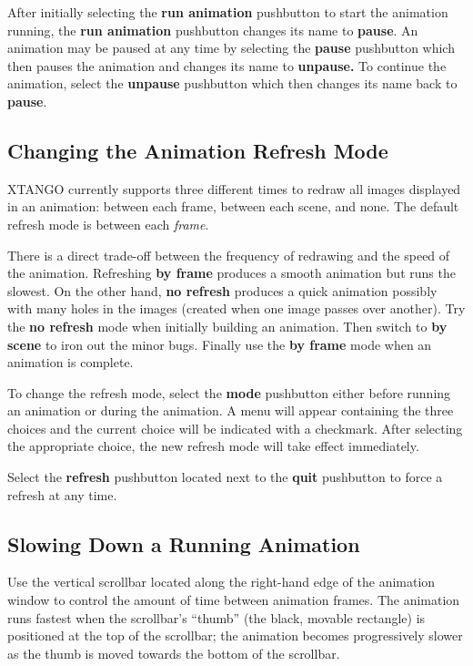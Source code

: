 After initially selecting the {\bf run animation} pushbutton to start the
animation running, the {\bf run animation} pushbutton changes its name to
{\bf pause}.  An animation may be paused at any time by selecting the
{\bf pause} pushbutton which then pauses the animation and changes its name
to {\bf unpause.} To continue the animation, select the {\bf unpause}
pushbutton which then changes its name back to {\bf pause}.

\subsection{Changing the Animation Refresh Mode}

XTANGO currently supports three different times to redraw all images
displayed in an animation: between each frame, between each scene, and
none.  The default refresh mode is between each {\em frame}.

There is a direct trade-off between the frequency of redrawing and the
speed of the animation.  Refreshing {\bf by frame} produces a smooth
animation but runs the slowest.  On the other hand, {\bf no refresh}
produces a quick animation possibly with many holes in the images
(created when one image passes over another).  Try the {\bf no refresh}
mode when initially building an animation.  Then switch to {\bf by scene}
to iron out the minor bugs.  Finally use the {\bf by frame} mode when an
animation is complete.

To change the refresh mode, select the {\bf mode} pushbutton either
before running an animation or during the animation.  A menu will
appear containing the three choices and the current choice will be
indicated with a checkmark.  After selecting the appropriate choice,
the new refresh mode will take effect immediately.

Select the {\bf refresh} pushbutton located next to the {\bf quit}
pushbutton to force a refresh at any time.

\subsection{Slowing Down a Running Animation}

Use the vertical scrollbar located along the right-hand edge of the
animation window to control the amount of time between animation frames.
The animation runs fastest when the scrollbar's ``thumb'' (the black,
movable rectangle) is positioned at the top of the scrollbar; the
animation becomes progressively slower as the thumb is moved towards
the bottom of the scrollbar.

